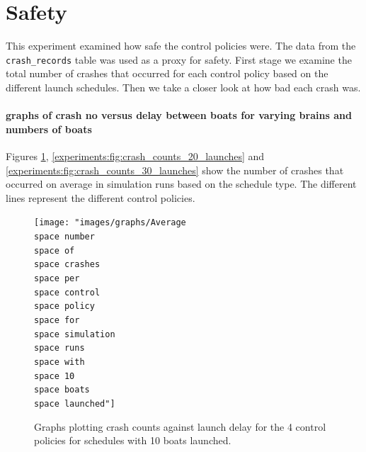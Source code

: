 \section{Safety}
This experiment examined how safe the control policies were. The data from the \texttt{crash\_records} table was used as a proxy for safety. First stage we examine the total number of crashes that occurred for each control policy based on the different launch schedules. Then we take a closer look at how bad each crash was.

  \paragraph{graphs of crash no versus delay between boats for varying brains and numbers of boats}
  Figures \ref{experiments:fig:crash_counts_10_launches}, \ref{experiments:fig:crash_counts_20_launches} and \ref{experiments:fig:crash_counts_30_launches} show the number of crashes that occurred on average in simulation runs based on the schedule type. The different lines represent the different control policies.
  
  \begin{figure}
  \begin{center}
    \texttt{[image: "images/graphs/Average\\space number\\space of\\space crashes\\space per\\space control\\space policy\\space for\\space simulation\\space runs\\space with\\space 10\\space boats\\space launched"]}
    \caption{Graphs plotting crash counts against launch delay for the 4 control policies for schedules with 10 boats launched.}
    \label{experiments:fig:crash_counts_10_launches}
  \end{center}
  \end{figure}
  
